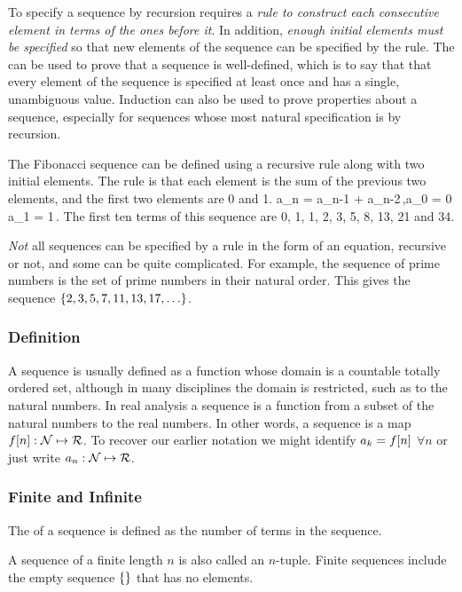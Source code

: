To specify a sequence by recursion requires a \emph{rule to construct each consecutive element in terms of the ones before it}. In addition, \emph{enough initial elements must be specified} so that new elements of the sequence can be specified by the rule. The  can be used to prove that a sequence is well-defined, which is to say that that every element of the sequence is specified at least once and has a single, unambiguous value. Induction can also be used to prove properties about a sequence, especially for sequences whose most natural specification is by recursion.

The Fibonacci sequence can be defined using a recursive rule along with two initial elements. The rule is that each element is the sum of the previous two elements, and the first two elements are 0 and 1.
\beq
a_n = a_{n-1} + a_{n-2}\,,\qquad{}\qquad a_0 = 0 a_1 = 1\,.
\eeq
The first ten terms of this sequence are 0, 1, 1, 2, 3, 5, 8, 13, 21 and 34.

\emph{Not} all sequences can be specified by a rule in the form of an equation, recursive or not, and some can be quite complicated. For example, the sequence of prime numbers is the set of prime numbers in their natural order. This gives the sequence $\left\lbrace{2,3,5,7,11,13,17,\dotsc}\right\rbrace$.


\subsubsection{Definition}
A sequence is usually defined as a function whose domain is a countable totally ordered set, although in many disciplines the domain is restricted, such as to the natural numbers. In real analysis a sequence is a function from a subset of the natural numbers to the real numbers. In other words, a sequence is a map ${f\!\left[{n}\right]}:{\mathcal{N}}\mapsto{\mathcal{R}}$. To recover our earlier notation we might identify $a_k = f\!\left[{n}\right]$ $\forall n$ or just write ${a_n}:{\mathcal{N}}\mapsto{\mathcal{R}}$.


\subsubsection{Finite and Infinite}
The  of a sequence is defined as the number of terms in the sequence.

A sequence of a finite length $n$ is also called an $n$-tuple. Finite sequences include the empty sequence $\left\lbrace{}\right\rbrace$ that has no elements.

